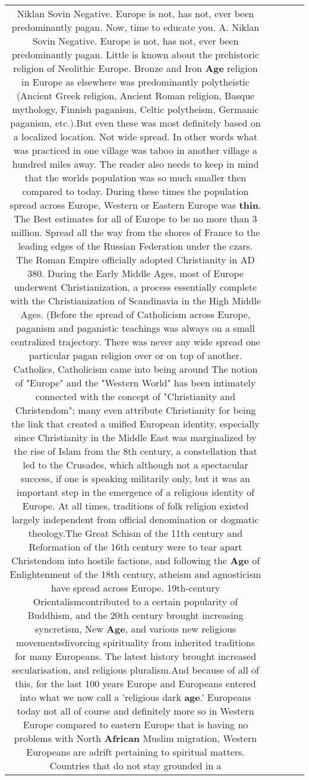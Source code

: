 \documentclass[11pt]{article}
\newlength\mylength
\begin{document}
\begin{center}
\begin{longtable}{|C{.65\mylength}|C{.30\mylength}|C{.12\mylength}|C{.12\mylength}|C{.12\mylength}|}
  \small Niklan Sovin   Negative.  Europe is not, has not,  ever been predominantly pagan.  Now, time to educate you.    A. Niklan Sovin  Negative.  Europe is not, has not,  ever been predominantly pagan. Little is known about the prehistoric religion of Neolithic Europe. Bronze and Iron \textbf{Age} religion in Europe as elsewhere was predominantly polytheistic (Ancient Greek religion, Ancient Roman religion, Basque mythology, Finnish paganism, Celtic polytheism, Germanic paganism, etc.).But even these was most definitely based on a localized location. Not wide spread. In other words what was practiced  in one village was taboo in another village a hundred miles away. The reader also needs to keep in mind that the worlds population was so much smaller then compared to today. During these times the  population spread across Europe, Western or Eastern Europe was \textbf{thin}. The Best estimates for all of Europe to be no more than 3 million. Spread all the way from the shores of France to the leading edges of the Russian Federation under the czars. The Roman Empire officially adopted Christianity in AD 380. During the Early Middle Ages, most of Europe underwent Christianization, a process essentially complete with the Christianization of Scandinavia in the High Middle Ages. (Before the spread of Catholicism across Europe, paganism and paganistic teachings was always on a small centralized trajectory. There was never any wide spread one particular pagan religion over or on top of another.  Catholics, Catholicism came into being around The notion of "Europe" and the "Western World" has been intimately connected with the concept of "Christianity and Christendom"; many even attribute Christianity for being the link that created a unified European identity, especially since Christianity in the Middle East was marginalized by the rise of Islam from the 8th century, a constellation that led to the Crusades, which although not a spectacular success, if one is speaking militarily only,  but it was an important step in the emergence of a religious identity of Europe. At all times, traditions of folk religion existed largely independent from official denomination or dogmatic theology.The Great Schism of the 11th century and Reformation of the 16th century were to tear apart Christendom into hostile factions, and following the \textbf{Age} of Enlightenment of the 18th century, atheism and agnosticism have spread across Europe. 19th-century Orientalismcontributed to a certain popularity of Buddhism, and the 20th century brought increasing syncretism, New \textbf{Age}, and various new religious movementsdivorcing spirituality from inherited traditions for many Europeans. The latest history brought increased secularisation, and religious pluralism.And because of all of this, for the last 100 years Europe and Europeans entered into what we now call a 'religious dark \textbf{age}.'  Europeans today not all of course and definitely more so in Western Europe compared to eastern Europe that is having no problems with North \textbf{African} Muslim migration, Western Europeans are adrift  pertaining to spiritual matters. Countries that do not stay grounded in a 
\end{longtable}
\end{center}
\end{document}
